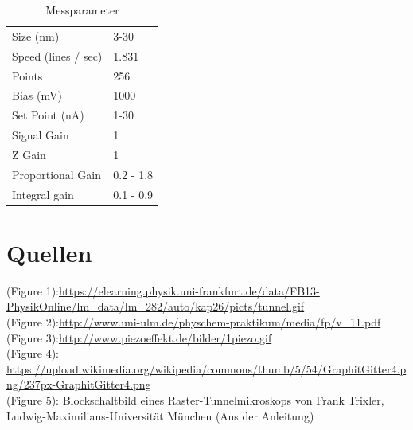 \documentclass[10pt,a4paper]{article}
\begin{document}
\begin{table}[]
	\centering
	\caption{Messparameter}
	\label{Messparameter}
	\begin{tabular}{ll}
		Size (nm)           & 3-30      \\
		Speed (lines / sec) & 1.831     \\
		Points              & 256       \\
		Bias (mV)           & 1000      \\
		Set Point (nA)      & 1-30      \\
		Signal Gain         & 1         \\
		Z Gain              & 1         \\
		Proportional Gain   & 0.2 - 1.8 \\
		Integral gain       & 0.1 - 0.9
	\end{tabular}
\end{table}



\section{Quellen}
(Figure 1):\url{https://elearning.physik.uni-frankfurt.de/data/FB13-PhysikOnline/lm_data/lm_282/auto/kap26/picts/tunnel.gif}\\
(Figure 2):\url{http://www.uni-ulm.de/physchem-praktikum/media/fp/v_11.pdf}\\
(Figure 3):\url{http://www.piezoeffekt.de/bilder/1piezo.gif}\\
(Figure 4): \url{https://upload.wikimedia.org/wikipedia/commons/thumb/5/54/GraphitGitter4.png/237px-GraphitGitter4.png}\\
(Figure 5): Blockschaltbild eines Raster-Tunnelmikroskops von Frank Trixler, Ludwig-Maximilians-Universität München (Aus der Anleitung)
\end{document}
